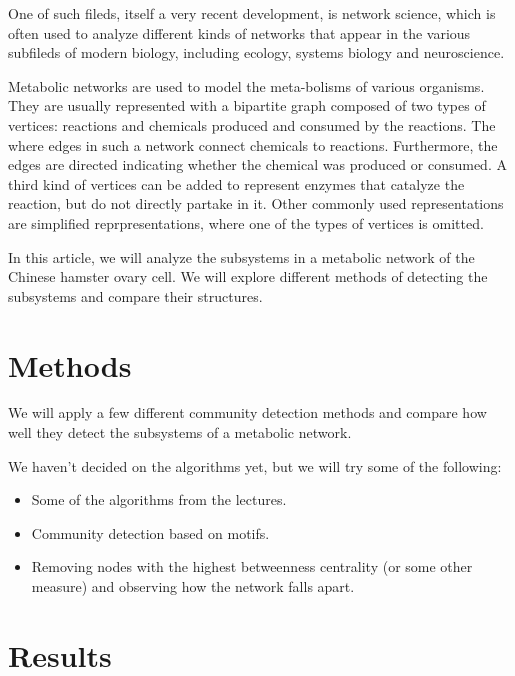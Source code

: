 One of such fileds, itself a very recent development, is network science, which
is often used to analyze different kinds of networks that appear in the various
subfileds of modern biology, including ecology\cite{proulx2005network}, systems
biology\cite{barabasi2004network} and
neuroscience\cite{sporns2014contributions}.

Metabolic networks\cite{jeong2000large} are used to model the meta-bolisms of
various organisms. They are usually represented with a bipartite graph composed
of two types of vertices: reactions and chemicals produced and consumed by the
reactions. The where edges in such a network connect chemicals to
reactions. Furthermore, the edges are directed indicating whether the chemical
was produced or consumed. A third kind of vertices can be added to represent
enzymes that catalyze the reaction, but do not directly partake in
it. Other commonly used representations are simplified reprpresentations, where
one of the types of vertices is omitted\cite{newman2010networks}.

In this article, we will analyze the subsystems in a metabolic network of the
Chinese hamster ovary cell. We will explore different methods of detecting the
subsystems and compare their structures.

\section{Methods}
\label{sec:methods}

We will apply a few different community detection methods and compare how well
they detect the subsystems of a metabolic network.

We haven't decided on the algorithms yet, but we will try some of the following:

\begin{itemize}
\item
  Some of the algorithms from the lectures.
\item
  Community detection based on motifs\cite{benson2016higher}.
\item
  Removing nodes with the highest betweenness centrality (or some other measure)
  and observing how the network falls apart\cite{holme2003subnetwork}.
\end{itemize}

\section{Results}
\label{sec:results}

